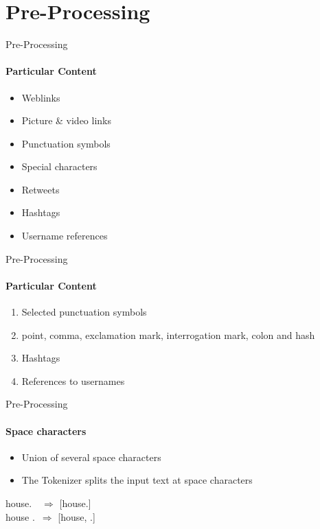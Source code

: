 \documentclass{beamer}
\begin{document}
\section{Pre-Processing}

\begin{frame}{Pre-Processing}
\framesubtitle{Particular Content}
\begin{itemize}
\item Weblinks
\item Picture \& video links
\item Punctuation symbols
\item Special characters
\item Retweets
\item Hashtags
\item Username references
\end{itemize}
\end{frame}

\begin{frame}{Pre-Processing}
\framesubtitle{Particular Content}
\begin{remark_box}
\begin{enumerate}
 \item Selected punctuation symbols
 \item[] \small{point, comma, exclamation mark, interrogation mark, colon and hash}
 \normalsize
 \item Hashtags
 \item References to usernames
\end{enumerate}
\end{remark_box} 
\end{frame}

\begin{frame}{Pre-Processing}
\framesubtitle{Space characters}
\begin{itemize}
\item Union of several space characters
\item The Tokenizer splits the input text at space characters
\end{itemize}
\vspace{5mm}
\pause
\begin{attention_box}
house.~~$\Rightarrow$ [\textquotedbl house.\textquotedbl]\\
house .~$\Rightarrow$ [\textquotedbl house\textquotedbl , \textquotedbl .\textquotedbl]
\end{attention_box}
\end{frame}
\end{document}
